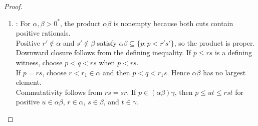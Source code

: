 \begin{theorem}
\begin{proof}
\begin{enumerate}[label=(\roman*)]
\begin{enumerate}[label=(\alph*)]
Commutativity and associativity follow from the rational identities. Inclusion $\alpha+0^*\subseteq\alpha$ holds by downward closure.\\
The reverse inclusion follows from $p=r+(p-r)$ with $p<r\in\alpha$, so $\alpha+0^*=\alpha$.\\
The set $-\alpha$ is nonempty by any $q\notin\alpha$ and the witness $p=-q-1$. It is proper because $-a\notin-\alpha$ for $a\in\alpha$.\\
Downward closure follows from upward closure of $\Q\setminus\alpha$, and $p\in-\alpha$ with witness $r>0$ satisfies $p<p+\frac{r}{2}\in-\alpha$.\\
Thus $-\alpha$ is a cut. For $s\in-\alpha$, relation $-s\notin\alpha$ follows by its witness, so $(\forall r\in\alpha)\,r+s<0$ and $\alpha+(-\alpha)\subseteq0^*$.\\
For the reverse inclusion, let $v<0$ and set $w\defeq-\frac{v}{2}>0$. Rational multiples of $w$ are unbounded in both directions.\\
Indeed, if $w=\frac{A}{B}$ and $q=\frac{C}{D}$ with $A,B,D\in\N$, then $n=B(\abs{C}+1)$ satisfies $nw>q$.\\
The same calculation for $-q$ supplies a negative multiple below $q$.\\
Choose $a\in\alpha$ and $b\notin\alpha$. Select $j<k$ in $\Z$ with $jw<a$ and $kw>b$ by this unboundedness.\\
The finite set $\{\ell\in\Z:j\leq\ell\leq k,\ \ell w\in\alpha\}$ has a largest element $n$, with $(n+1)w\notin\alpha$.\\
The relations $nw\in\alpha$, $-(n+2)w\in-\alpha$ with witness $w$, and $v=nw-(n+2)w$ prove $v\in\alpha+(-\alpha)$. Hence $\alpha+(-\alpha)=0^*$.
\item {}: For $\alpha,\beta>0^*$, the product $\alpha\beta$ is nonempty because both cuts contain positive rationals.\\
Positive $r'\notin\alpha$ and $s'\notin\beta$ satisfy $\alpha\beta\subseteq\{p:p<r's'\}$, so the product is proper.\\
Downward closure follows from the defining inequality. If $p\leq rs$ is a defining witness, choose $p<q<rs$ when $p<rs$.\\
If $p=rs$, choose $r<r_1\in\alpha$ and then $p<q<r_1s$. Hence $\alpha\beta$ has no largest element.\\
Commutativity follows from $rs=sr$. If $p\in(\alpha\beta)\gamma$, then $p\leq ut\leq rst$ for positive $u\in\alpha\beta$, $r\in\alpha$, $s\in\beta$, and $t\in\gamma$.\\

\end{enumerate}
\end{enumerate}
\end{proof}
\end{theorem}
